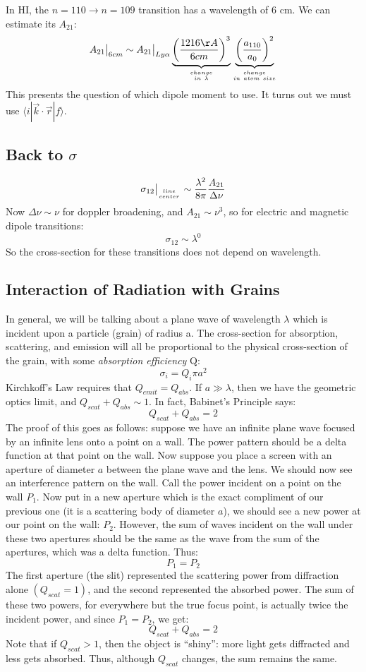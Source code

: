 \documentclass[11pt]{article}
\def\sigot{\sigma_{12}}
\def\eval#1{\big|_{#1}}
\def\ato{{A_{21}}}
\begin{document}
In HI, the $n=110\to n=109$ transition has a wavelength of 6 cm.  We can
estimate its $\ato$:
$$\ato\eval{6cm}\sim\ato\eval{Ly\alpha}
\underbrace{\left({1216\AA\over6cm}\right)^3}_{change\atop in\ \lambda}
\underbrace{\left({a_{110}\over a_0}\right)^2}_{change\atop in\ atom\ size}$$
\def\bra#1{\langle #1|}
\def\ket#1{|#1\rangle}
This presents the question of which dipole moment to use.  It turns out
we must use $\bra{i}\vec k\cdot\vec r\ket{f}$.

\subsection*{ Back to $\sigma$}

$$\sigot\eval{line\atop center}\sim{\lambda^2\over8\pi}{\ato\over\Delta\nu}$$
Now $\Delta\nu\sim\nu$ for doppler broadening, and $\ato\sim\nu^3$, so for
electric and magnetic dipole transitions:
$$\sigot\sim\lambda^0$$
So the cross-section for these transitions does not depend on wavelength.

\subsection*{ Interaction of Radiation with Grains}

In general, we will be talking about a plane wave of wavelength $\lambda$
which is incident upon a particle (grain) of radius a.  The cross-section
for absorption, scattering, and emission will all be proportional to the
physical cross-section of the grain, with some {\it absorption efficiency}
Q:
$$\sigma_i=Q_i\pi a^2$$
Kirchkoff's Law requires that $Q_{emit}=Q_{abs}$.  If $a\gg\lambda$, then
\def\qscat{Q_{scat}}
\def\qabs{Q_{abs}}
we have the geometric optics limit, and $\qscat+\qabs\sim1$.  In fact,
Babinet's Principle says:
$$\boxed{\qscat+\qabs=2}$$
The proof of this goes as follows: suppose we have an infinite plane wave
focused by an infinite lens onto a point on a wall.  The power pattern
should be a delta function at that point on the wall.  Now suppose you
place a screen with an aperture of diameter $a$ between the plane wave
and the lens.  We should now see an interference pattern on the wall.  Call
the power incident on a point on the wall $P_1$.  Now put in a new aperture
which is the exact compliment of our previous one (it is a scattering
body of diameter $a$), we should see a new power at our point on the wall: 
$P_2$.
However, the sum of waves incident on the wall under these two apertures
should be the same as the wave from the sum of the apertures, which was
a delta function.  Thus:
$$P_1=P_2$$
The first aperture (the slit) represented the scattering power from 
diffraction alone $(\qscat=1)$, and the second represented the absorbed 
power.  The sum of these two powers, for everywhere but the true focus
point, is actually twice the incident power, and since $P_1=P_2$, we
get:
$$\qscat+\qabs=2$$
Note that if $\qscat>1$, then the object is ``shiny'': more light gets
diffracted and less gets absorbed.  Thus, although $\qscat$ changes,
the sum remains the same.
\end{document}
